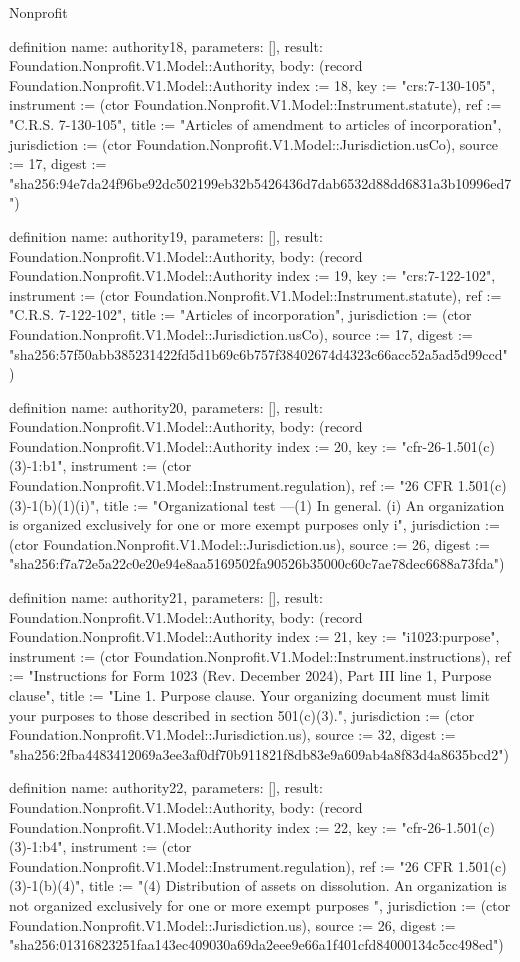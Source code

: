 \begin{lexlean}{Nonprofit}
\begin{semanticmodule}
definition{
  name: authority18,
  parameters: [],
  result: Foundation.Nonprofit.V1.Model::Authority,
  body: (record Foundation.Nonprofit.V1.Model::Authority {index := 18, key := "crs:7-130-105", instrument := (ctor Foundation.Nonprofit.V1.Model::Instrument.statute), ref := "C.R.S. 7-130-105", title := "Articles of amendment to articles of incorporation", jurisdiction := (ctor Foundation.Nonprofit.V1.Model::Jurisdiction.usCo), source := 17, digest := "sha256:94e7da24f96be92dc502199eb32b5426436d7dab6532d88dd6831a3b10996ed7"})
}

definition{
  name: authority19,
  parameters: [],
  result: Foundation.Nonprofit.V1.Model::Authority,
  body: (record Foundation.Nonprofit.V1.Model::Authority {index := 19, key := "crs:7-122-102", instrument := (ctor Foundation.Nonprofit.V1.Model::Instrument.statute), ref := "C.R.S. 7-122-102", title := "Articles of incorporation", jurisdiction := (ctor Foundation.Nonprofit.V1.Model::Jurisdiction.usCo), source := 17, digest := "sha256:57f50abb385231422fd5d1b69c6b757f38402674d4323c66acc52a5ad5d99ccd"})
}

definition{
  name: authority20,
  parameters: [],
  result: Foundation.Nonprofit.V1.Model::Authority,
  body: (record Foundation.Nonprofit.V1.Model::Authority {index := 20, key := "cfr-26-1.501(c)(3)-1:b1", instrument := (ctor Foundation.Nonprofit.V1.Model::Instrument.regulation), ref := "26 CFR 1.501(c)(3)-1(b)(1)(i)", title := "Organizational test —(1) In general. (i) An organization is organized exclusively for one or more exempt purposes only i", jurisdiction := (ctor Foundation.Nonprofit.V1.Model::Jurisdiction.us), source := 26, digest := "sha256:f7a72e5a22c0e20e94e8aa5169502fa90526b35000c60c7ae78dec6688a73fda"})
}

definition{
  name: authority21,
  parameters: [],
  result: Foundation.Nonprofit.V1.Model::Authority,
  body: (record Foundation.Nonprofit.V1.Model::Authority {index := 21, key := "i1023:purpose", instrument := (ctor Foundation.Nonprofit.V1.Model::Instrument.instructions), ref := "Instructions for Form 1023 (Rev. December 2024), Part III line 1, Purpose clause", title := "Line 1. Purpose clause. Your organizing document must limit your purposes to those described in section 501(c)(3).", jurisdiction := (ctor Foundation.Nonprofit.V1.Model::Jurisdiction.us), source := 32, digest := "sha256:2fba4483412069a3ee3af0df70b911821f8db83e9a609ab4a8f83d4a8635bcd2"})
}

definition{
  name: authority22,
  parameters: [],
  result: Foundation.Nonprofit.V1.Model::Authority,
  body: (record Foundation.Nonprofit.V1.Model::Authority {index := 22, key := "cfr-26-1.501(c)(3)-1:b4", instrument := (ctor Foundation.Nonprofit.V1.Model::Instrument.regulation), ref := "26 CFR 1.501(c)(3)-1(b)(4)", title := "(4) Distribution of assets on dissolution. An organization is not organized exclusively for one or more exempt purposes ", jurisdiction := (ctor Foundation.Nonprofit.V1.Model::Jurisdiction.us), source := 26, digest := "sha256:01316823251faa143ec409030a69da2eee9e66a1f401cfd84000134c5cc498ed"})
}


\end{semanticmodule}
\end{lexlean}
